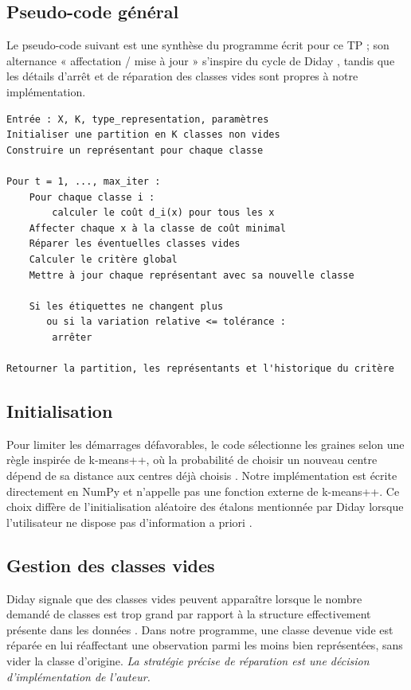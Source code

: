 \documentclass[12pt,a4paper]{article}
\begin{document}
\subsection{Pseudo-code général}

Le pseudo-code suivant est une synthèse du programme écrit pour ce TP ; son alternance « affectation / mise à jour » s'inspire du cycle de Diday \cite[p.~21]{diday1971}, tandis que les détails d'arrêt et de réparation des classes vides sont propres à notre implémentation.

\begin{lstlisting}[language={},caption={Pseudo-code du moteur développé. Source : conception de l'auteur à partir du cycle général de Diday \cite{diday1971}.}]
Entrée : X, K, type_representation, paramètres
Initialiser une partition en K classes non vides
Construire un représentant pour chaque classe

Pour t = 1, ..., max_iter :
    Pour chaque classe i :
        calculer le coût d_i(x) pour tous les x
    Affecter chaque x à la classe de coût minimal
    Réparer les éventuelles classes vides
    Calculer le critère global
    Mettre à jour chaque représentant avec sa nouvelle classe

    Si les étiquettes ne changent plus
       ou si la variation relative <= tolérance :
        arrêter

Retourner la partition, les représentants et l'historique du critère
\end{lstlisting}

\subsection{Initialisation}

Pour limiter les démarrages défavorables, le code sélectionne les graines selon une règle inspirée de k-means++, où la probabilité de choisir un nouveau centre dépend de sa distance aux centres déjà choisis \cite{arthur2007}. Notre implémentation est écrite directement en NumPy et n'appelle pas une fonction externe de k-means++. Ce choix diffère de l'initialisation aléatoire des étalons mentionnée par Diday lorsque l'utilisateur ne dispose pas d'information a priori \cite[p.~23]{diday1971}.

\subsection{Gestion des classes vides}

Diday signale que des classes vides peuvent apparaître lorsque le nombre demandé de classes est trop grand par rapport à la structure effectivement présente dans les données \cite[p.~25]{diday1971}. Dans notre programme, une classe devenue vide est réparée en lui réaffectant une observation parmi les moins bien représentées, sans vider la classe d'origine. \textit{La stratégie précise de réparation est une décision d'implémentation de l'auteur.}
\end{document}
